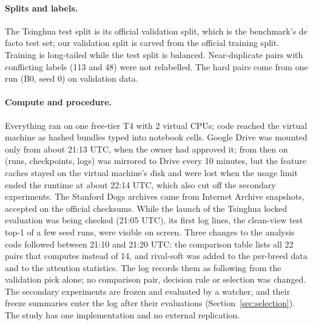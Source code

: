\documentclass[11pt,a4paper]{article}
\theoremstyle{plain}
\newcommand{\fn}[1]{\texttt{\detokenize{#1}}}
\begin{document}
\paragraph{Splits and labels.} The Tsinghua test split is its official validation split, which is the benchmark's de
facto test set; our validation split is carved from the official training split. Training is long-tailed while the
test split is balanced. Near-duplicate pairs with conflicting labels (113 and 48) were not relabelled. The hard pairs
come from one run (B0, seed 0) on validation data.

\paragraph{Compute and procedure.} Everything ran on one free-tier T4 with 2 virtual CPUs; code reached the virtual
machine as hashed bundles typed into notebook cells. Google Drive was mounted only from about 21:13 UTC, when the
owner had approved it; from then on \fn{/content/work} (runs, checkpoints, logs) was mirrored to Drive every 10
minutes, but the feature caches stayed on the virtual machine's disk and were lost when the usage limit ended the
runtime at about 22:14 UTC, which also cut off the secondary experiments. The Stanford Dogs archives came from Internet
Archive snapshots, accepted on the official checksums. While the launch of the Tsinghua locked evaluation was being
checked (21:05 UTC), its first log lines, the clean-view test top-1 of a few seed runs, were visible on screen.
Three changes to the analysis code followed between 21:10 and 21:20 UTC: the comparison table lists all 22 pairs
that \fn{final_all.sh} computes instead of 14, and rival-soft was added to the per-breed data and to the attention
statistics. The log records them as following from the validation pick alone; no comparison pair, decision rule or
selection was changed. The secondary experiments are frozen and evaluated by a watcher, and their freeze summaries
enter the log after their evaluations (Section~\ref{sec:selection}). The study has one implementation and no
external replication.

\end{document}
